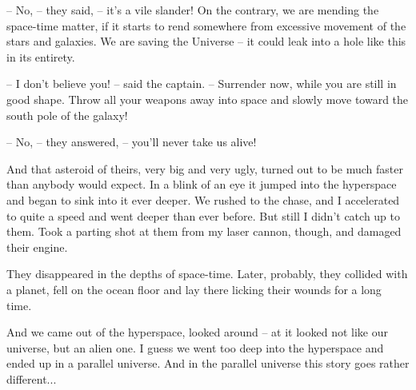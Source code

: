 \documentclass[ebook,oneside,final,openright]{memoir}
\begin{document}
– No, – they said, – it’s a vile slander! On the contrary, we are mending the space-time matter, if it starts to rend somewhere from excessive movement of the stars and galaxies. We are saving the Universe – it could leak into a hole like this in its entirety.\par
– I don’t believe you! – said the captain. – Surrender now, while you are still in good shape. Throw all your weapons away into space and slowly move toward the south pole of the galaxy!\par
– No, – they answered, – you’ll never take us alive!\par
And that asteroid of theirs, very big and very ugly, turned out to be much faster than anybody would expect. In a blink of an eye it jumped into the hyperspace and began to sink into it ever deeper. We rushed to the chase, and I accelerated to quite a speed and went deeper than ever before. But still I didn’t catch up to them. Took a parting shot at them from my laser cannon, though, and damaged their engine.\par
They disappeared in the depths of space-time. Later, probably, they collided with a planet, fell on the ocean floor and lay there licking their wounds for a long time.\par
And we came out of the hyperspace, looked around – at it looked not like our universe, but an alien one. I guess we went too deep into the hyperspace and ended up in a parallel universe. And in the parallel universe this story goes rather different...
\end{document}
